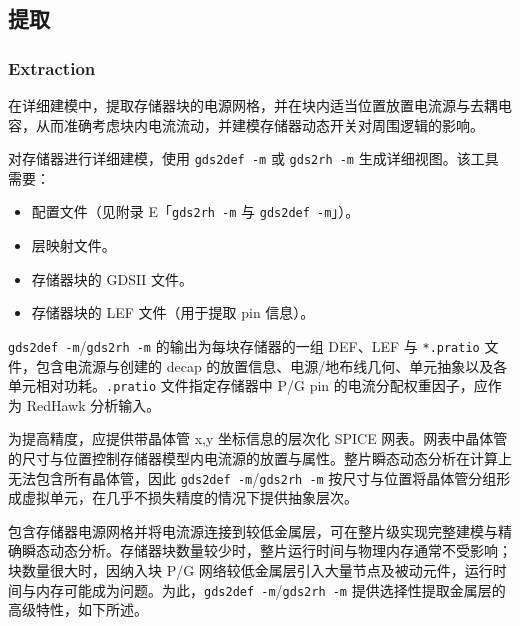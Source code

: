 \subsection{提取}
\subsubsection*{Extraction}

在详细建模中，提取存储器块的电源网格，并在块内适当位置放置电流源与去耦电容，从而准确考虑块内电流流动，并建模存储器动态开关对周围逻辑的影响。

对存储器进行详细建模，使用 \texttt{gds2def -m} 或 \texttt{gds2rh -m} 生成详细视图。该工具需要：
\begin{itemize}
  \item 配置文件（见附录 E「\texttt{gds2rh -m} 与 \texttt{gds2def -m}」）。
  \item 层映射文件。
  \item 存储器块的 GDSII 文件。
  \item 存储器块的 LEF 文件（用于提取 pin 信息）。
\end{itemize}

\texttt{gds2def -m}/\texttt{gds2rh -m} 的输出为每块存储器的一组 DEF、LEF 与 \texttt{*.pratio} 文件，包含电流源与创建的 decap 的放置信息、电源/地布线几何、单元抽象以及各单元相对功耗。\texttt{.pratio} 文件指定存储器中 P/G pin 的电流分配权重因子，应作为 RedHawk 分析输入。

为提高精度，应提供带晶体管 x,y 坐标信息的层次化 SPICE 网表。网表中晶体管的尺寸与位置控制存储器模型内电流源的放置与属性。整片瞬态动态分析在计算上无法包含所有晶体管，因此 \texttt{gds2def -m}/\texttt{gds2rh -m} 按尺寸与位置将晶体管分组形成虚拟单元，在几乎不损失精度的情况下提供抽象层次。

包含存储器电源网格并将电流源连接到较低金属层，可在整片级实现完整建模与精确瞬态动态分析。存储器块数量较少时，整片运行时间与物理内存通常不受影响；块数量很大时，因纳入块 P/G 网络较低金属层引入大量节点及被动元件，运行时间与内存可能成为问题。为此，\texttt{gds2def -m}/\texttt{gds2rh -m} 提供选择性提取金属层的高级特性，如下所述。

